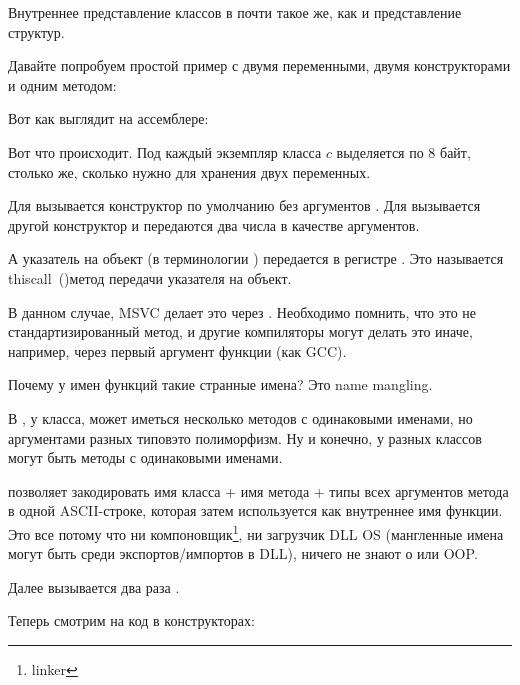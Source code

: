 
Внутреннее представление классов в \Cpp почти такое же, как и представление структур.

Давайте попробуем простой пример с двумя переменными, двумя конструкторами и одним методом:




Вот как выглядит \main на ассемблере:



Вот что происходит. 
Под каждый экземпляр класса $c$ выделяется по 8 байт, столько же, сколько нужно 
для хранения двух переменных.

Для  вызывается конструктор по умолчанию без аргументов . 
Для  вызывается другой конструктор  и передаются два числа в качестве аргументов.

\label{thiscall}
А указатель на объект (\ITthis в терминологии \Cpp) передается в регистре \ECX. 
Это называется thiscall~()\EMDASH{}метод передачи указателя на объект.

В данном случае, MSVC делает это через \ECX. Необходимо помнить, что это не стандартизированный метод, 
и другие компиляторы могут делать это иначе, например, через первый аргумент функции (как GCC).

\label{namemangling}
Почему у имен функций такие странные имена? Это \gls{name mangling}.

В \Cpp, у класса, может иметься несколько методов с одинаковыми именами, 
но аргументами разных типов\EMDASH{}это полиморфизм. 
Ну и конечно, у разных классов могут быть методы с одинаковыми именами.

 позволяет закодировать имя класса + имя метода + типы всех аргументов метода 
в одной ASCII-строке, которая затем используется как внутреннее имя функции. 
Это все потому что ни компоновщик\footnote{linker}, ни загрузчик DLL \ac{OS}
(мангленные имена могут быть среди экспортов/импортов в DLL), 
ничего не знают о \Cpp или \ac{OOP}.

Далее вызывается два раза .

Теперь смотрим на код в конструкторах:

